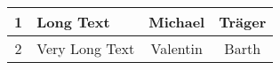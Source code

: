 \begin{tabular}{|c|p{20mm}|c|c|}
\hline
1 & Long \newline  Text & Michael & Träger \\
\hline
2 & Very Long Text & Valentin & Barth \\
\hline
\end{tabular}